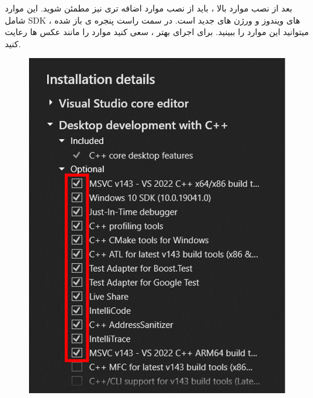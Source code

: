{  \large
بعد از نصب موارد بالا ، باید از نصب موارد اضافه تری نیز مطمئن شوید. این موارد شامل SDK های ویندوز و ورژن های جدید  است.
در سمت راست پنجره ی باز شده ، میتوانید این موارد را ببینید. برای اجرای بهتر ، سعی کنید موارد را مانند عکس ها رعایت کنید.

}
    \begin{figure}[H]
        \centering
        \includegraphics[scale=0.7]{Images/1.Intro.3.1.png}

\end{figure}
